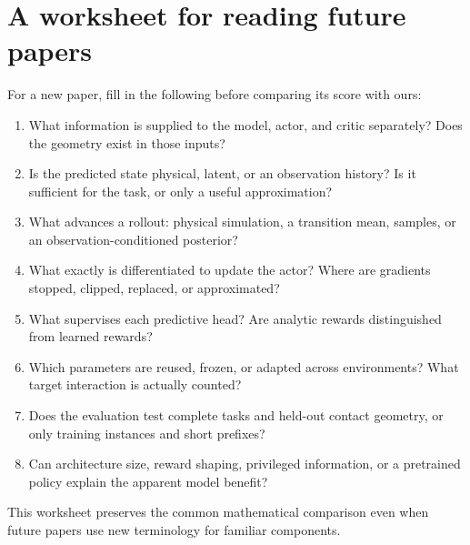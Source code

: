 \section{A worksheet for reading future papers}
For a new paper, fill in the following before comparing its score with ours:
\begin{enumerate}
\item What information is supplied to the model, actor, and critic separately?
Does the geometry exist in those inputs?
\item Is the predicted state physical, latent, or an observation history? Is it
sufficient for the task, or only a useful approximation?
\item What advances a rollout: physical simulation, a transition mean, samples,
or an observation-conditioned posterior?
\item What exactly is differentiated to update the actor? Where are gradients
stopped, clipped, replaced, or approximated?
\item What supervises each predictive head? Are analytic rewards distinguished
from learned rewards?
\item Which parameters are reused, frozen, or adapted across environments?
What target interaction is actually counted?
\item Does the evaluation test complete tasks and held-out contact geometry,
or only training instances and short prefixes?
\item Can architecture size, reward shaping, privileged information, or a
pretrained policy explain the apparent model benefit?
\end{enumerate}
This worksheet preserves the common mathematical comparison even when future
papers use new terminology for familiar components.
